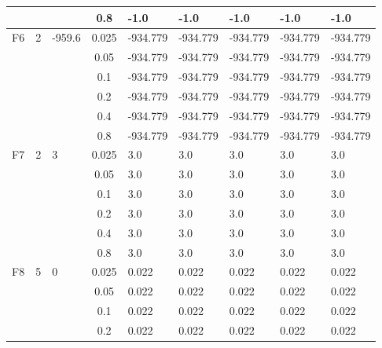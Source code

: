 \begin{longtable}{|l|l|l|c|l|l|l|l|l|}
\cmidrule{4-9} &     &          & 0.8            & -1.0       & -1.0       & -1.0       & -1.0       & -1.0       \\ \midrule
F6             & 2   & -959.6   & 0.025          & -934.779   & -934.779   & -934.779   & -934.779   & -934.779   \\
\cmidrule{4-9} &     &          & 0.05           & -934.779   & -934.779   & -934.779   & -934.779   & -934.779   \\
\cmidrule{4-9} &     &          & 0.1            & -934.779   & -934.779   & -934.779   & -934.779   & -934.779   \\
\cmidrule{4-9} &     &          & 0.2            & -934.779   & -934.779   & -934.779   & -934.779   & -934.779   \\
\cmidrule{4-9} &     &          & 0.4            & -934.779   & -934.779   & -934.779   & -934.779   & -934.779   \\
\cmidrule{4-9} &     &          & 0.8            & -934.779   & -934.779   & -934.779   & -934.779   & -934.779   \\ \midrule
F7             & 2   & 3        & 0.025          & 3.0        & 3.0        & 3.0        & 3.0        & 3.0        \\
\cmidrule{4-9} &     &          & 0.05           & 3.0        & 3.0        & 3.0        & 3.0        & 3.0        \\
\cmidrule{4-9} &     &          & 0.1            & 3.0        & 3.0        & 3.0        & 3.0        & 3.0        \\
\cmidrule{4-9} &     &          & 0.2            & 3.0        & 3.0        & 3.0        & 3.0        & 3.0        \\
\cmidrule{4-9} &     &          & 0.4            & 3.0        & 3.0        & 3.0        & 3.0        & 3.0        \\
\cmidrule{4-9} &     &          & 0.8            & 3.0        & 3.0        & 3.0        & 3.0        & 3.0        \\ \midrule
F8             & 5   & 0        & 0.025          & 0.022      & 0.022      & 0.022      & 0.022      & 0.022      \\
\cmidrule{4-9} &     &          & 0.05           & 0.022      & 0.022      & 0.022      & 0.022      & 0.022      \\
\cmidrule{4-9} &     &          & 0.1            & 0.022      & 0.022      & 0.022      & 0.022      & 0.022      \\
\cmidrule{4-9} &     &          & 0.2            & 0.022      & 0.022      & 0.022      & 0.022      & 0.022      \\

\end{longtable}
